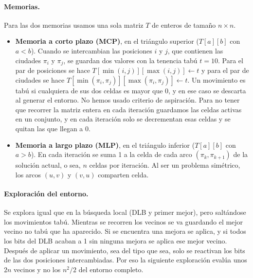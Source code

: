 \paragraph{Memorias.} Para las dos memorias usamos una sola matriz $T$ de enteros de tamaño $n \times n$.
\begin{itemize}
    \item \textbf{Memoria a corto plazo (MCP)}, en el triángulo superior ($T[a][b]$ con $a < b$). Cuando se intercambian las posiciones $i$ y $j$, que contienen las ciudades $\pi_i$ y $\pi_j$, se guardan dos valores con la tenencia tabú $t = 10$. Para el par de posiciones se hace $T[\min(i,j)][\max(i,j)] \gets t$ y para el par de ciudades se hace $T[\min(\pi_i,\pi_j)][\max(\pi_i,\pi_j)] \gets t$. Un movimiento es tabú si cualquiera de sus dos celdas es mayor que 0, y en ese caso se descarta al generar el entorno. No hemos usado criterio de aspiración. Para no tener que recorrer la matriz entera en cada iteración guardamos las celdas activas en un conjunto, y en cada iteración solo se decrementan esas celdas y se quitan las que llegan a 0.
    \item \textbf{Memoria a largo plazo (MLP)}, en el triángulo inferior ($T[a][b]$ con $a > b$). En cada iteración se suma 1 a la celda de cada arco $(\pi_k, \pi_{k+1})$ de la solución actual, o sea, $n$ celdas por iteración. Al ser un problema simétrico, los arcos $(u,v)$ y $(v,u)$ comparten celda.
\end{itemize}

\paragraph{Exploración del entorno.} Se explora igual que en la búsqueda local (DLB y primer mejor), pero saltándose los movimientos tabú. Mientras se recorren los vecinos se va guardando el mejor vecino no tabú que ha aparecido. Si se encuentra una mejora se aplica, y si todos los bits del DLB acaban a 1 sin ninguna mejora se aplica ese mejor vecino. Después de aplicar un movimiento, sea del tipo que sea, solo se reactivan los bits de las dos posiciones intercambiadas. Por eso la siguiente exploración evalúa unos $2n$ vecinos y no los $n^2/2$ del entorno completo.

